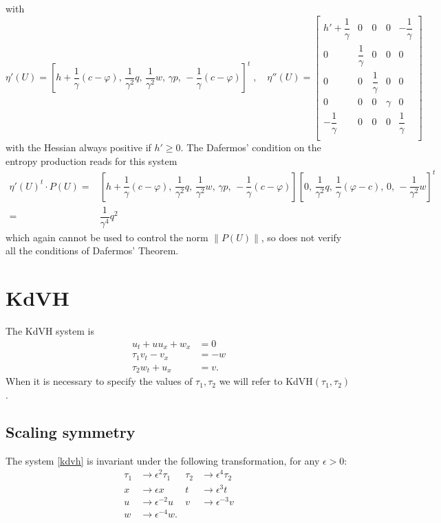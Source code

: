 \documentclass{article}
\theoremstyle{plain}
\theoremstyle{definition}
\numberwithin{theorem}{section}
\begin{document}
with
$$
\eta'(U)= [h+ \dfrac{1}{\gamma } (c-\varphi),\,  \dfrac{1}{\gamma^2 }q,\,  \dfrac{1}{\gamma^2 }w,\, \gamma p,\,    -\dfrac{1}{\gamma } (c-\varphi) ]^t\;,\quad 
\eta''(U) =   \left[\begin{array}{ccccc}
h' +\dfrac{1}{\gamma} &0&0&0&-\dfrac{1}{\gamma} \\
0 & \dfrac{1}{\gamma} &0&0&0\\
0 & 0&\dfrac{1}{\gamma} &0&0\\
0 & 0&0& \gamma &0\\
-\dfrac{1}{\gamma} & 0&0& 0 &\dfrac{1}{\gamma} \\
\end{array}
\right]
$$
with the Hessian always positive if $h'\ge 0$. The Dafermos' condition on the entropy production  reads for this system
$$
\begin{aligned}
\eta'(U)^t\cdot P(U) = &[h+ \dfrac{1}{\gamma } (c-\varphi),\,  \dfrac{1}{\gamma^2 }q,\,  \dfrac{1}{\gamma^2 }w,\, \gamma p,\,    -\dfrac{1}{\gamma } (c-\varphi) ]
[0,\,  \dfrac{1}{\gamma^2 }q,\,  \dfrac{1}{\gamma }(\varphi-c),\, 0,\,    -\dfrac{1}{\gamma^2 } w ]^t\\= &
 \dfrac{1}{\gamma^4 }q^2 
\end{aligned}
$$
which again cannot be used to control the norm $\|P(U)\|$, so does not verify all the conditions of Dafermos' Theorem.



\section{KdVH}

The KdVH system is
\begin{subequations} \label{kdvh}
\begin{align}
    u_t + uu_x + w_x & = 0 \\
    \tau_1 v_t - v_x & = -w \\
    \tau_2 w_t + u_x & = v.
\end{align}
\end{subequations}
When it is necessary to specify the values of $\tau_1, \tau_2$ we will
refer to KdVH$(\tau_1,\tau_2)$.

\subsection{Scaling symmetry}
The system \eqref{kdvh} is invariant under the following
transformation, for any $\epsilon>0$:
\begin{subequations}
\label{eq:scaling}
\begin{align}
    \tau_1 & \to \epsilon^2 \tau_1 & \tau_2 & \to \epsilon^4 \tau_2 \\
    x & \to \epsilon x & t & \to \epsilon^3 t \\
    u & \to \epsilon^{-2} u & v & \to \epsilon^{-3} v \\
    w & \to \epsilon^{-4} w.
\end{align}
\end{subequations}
\end{document}
